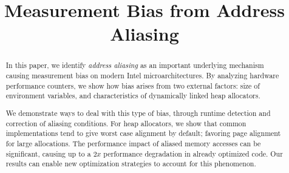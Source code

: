 \documentclass[10pt, conference, compsocconf]{IEEEtran}
\begin{document}
\title{Measurement Bias from Address Aliasing}

\author{
\and
{}
}

\maketitle

\begin{abstract} %
In this paper, we identify \emph{address aliasing} as an important underlying mechanism causing measurement bias on modern Intel microarchitectures.
By analyzing hardware performance counters, we show how bias arises from two external factors: size of environment variables, and characteristics of dynamically linked heap allocators.

We demonstrate ways to deal with this type of bias, through runtime detection and correction of aliasing conditions.
For heap allocators, we show that common implementations tend to give worst case alignment by default; favoring page alignment for large allocations.
The performance impact of aliased memory accesses can be significant, causing up to a $2x$ performance degradation in already optimized code.
Our results can enable new optimization strategies to account for this phenomenon.
\end{abstract}
\end{document}
